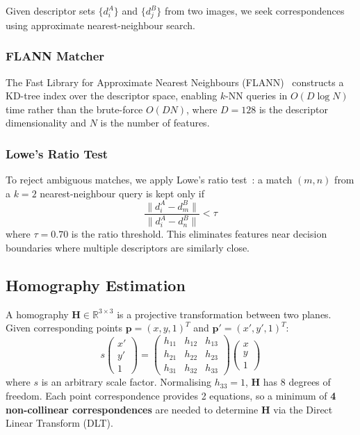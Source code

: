 \documentclass[conference]{IEEEtran}
\begin{document}
Given descriptor sets $\{d_i^A\}$ and $\{d_j^B\}$ from two images, we seek
correspondences using approximate nearest-neighbour search.

\subsubsection{FLANN Matcher}
The Fast Library for Approximate Nearest Neighbours (FLANN)~\cite{muja2009}
constructs a KD-tree index over the descriptor space, enabling $k$-NN queries
in $O(D \log N)$ time rather than the brute-force $O(DN)$, where $D=128$ is
the descriptor dimensionality and $N$ is the number of features.

\subsubsection{Lowe's Ratio Test}
To reject ambiguous matches, we apply Lowe's ratio test~\cite{lowe2004}:
a match $(m, n)$ from a $k=2$ nearest-neighbour query is kept only if
\begin{equation}
  \frac{\|d_i^A - d_m^B\|}{\|d_i^A - d_n^B\|} < \tau
\end{equation}
where $\tau = 0.70$ is the ratio threshold. This eliminates features near
decision boundaries where multiple descriptors are similarly close.

\subsection{Homography Estimation}

A homography $\mathbf{H} \in \mathbb{R}^{3 \times 3}$ is a projective
transformation between two planes. Given corresponding points
$\mathbf{p} = (x, y, 1)^T$ and $\mathbf{p}' = (x', y', 1)^T$:
\begin{equation}
  s \begin{pmatrix} x' \\ y' \\ 1 \end{pmatrix}
  = \begin{pmatrix} h_{11} & h_{12} & h_{13} \\
                     h_{21} & h_{22} & h_{23} \\
                     h_{31} & h_{32} & h_{33} \end{pmatrix}
    \begin{pmatrix} x \\ y \\ 1 \end{pmatrix}
  \label{eq:homography}
\end{equation}
where $s$ is an arbitrary scale factor. Normalising $h_{33} = 1$, $\mathbf{H}$
has 8 degrees of freedom. Each point correspondence provides 2 equations, so a
minimum of \textbf{4 non-collinear correspondences} are needed to determine
$\mathbf{H}$ via the Direct Linear Transform (DLT).
\end{document}
